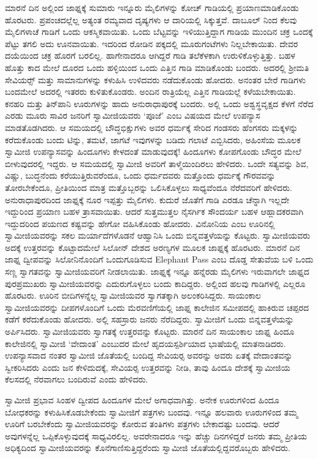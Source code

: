  ಮಾರನೆ ದಿನ ಅಲ್ಲಿಂದ ಜಾಫ್ನಕ್ಕೆ ಸುಮಾರು ಇನ್ನೂರು ಮೈಲಿಗಳನ್ನು ಕೋಚ್ ಗಾಡಿಯಲ್ಲಿ ಪ್ರಯಾಣಮಾಡಿಕೊಂಡು ಹೊರಟರು. ಪ್ರಪಂಚದಲ್ಲೆಲ್ಲ ಅತ್ಯಂತ ರಮ್ಯವಾದ ದೃಷ್ಯಗಳು ಆ ದಾರಿಯಲ್ಲಿ ಸಿಕ್ಕುತ್ತವೆ. ದಾಬೂಲ್ ನಿಂದ ಕೆಲವು ಮೈಲಿಗಳಾಚೆ ಗಾಡಿಗೆ ಒಂದು ಆಕಸ್ಮಿಕವಾಯಿತು. ಒಂದು ಬೆಟ್ಟವನ್ನು ಇಳಿಯುತ್ತಿದ್ದಾಗ ಗಾಡಿಯ ಮುಂದಿನ ಚಕ್ರ ಒಂದಕ್ಕೆ ಪೆಟ್ಟು ತಗಲಿ ಅದು ಊನವಾಯಿತು. ಇದರಿಂದ ರೋಡಿನ ಪಕ್ಕದಲ್ಲಿ ಮೂರುಗಂಟೆಗಳು ನಿಲ್ಲಬೇಕಾಯಿತು. ದೇವರ ದಯೆಯಿಂದ ಚಕ್ರ ಹೊರಗೆ ಬರಲಿಲ್ಲ. ಹಾಗೇನಾದರೂ ಆಗಿದ್ದರೆ ಗಾಡಿ ತಲೆಕೆಳಕಾಗಿ ಉರುಳಿಕೊಳ್ಳುತ್ತಿತ್ತು. ಬಹಳ ಹೊತ್ತು ಕಾದ ಮೇಲೆ ದೂರದ ಒಂದು ಹಳ್ಳಿಯಿಂದ ಒಂದು ಎತ್ತಿನ ಗಾಡಿ ಮಾಡಿಕೊಂಡು ಬಂದರು. ಅದರಲ್ಲಿ ಶ‍್ರೀಮತಿ ಸೇವಿಯರ್ಸ್‍‍ ಮತ್ತು ಸಾಮಾನುಗಳನ್ನು ಕಳುಹಿಸಿ ಉಳಿದವರು ನಡೆದುಕೊಂಡು ಹೋದರು. ಅನಂತರ ಬೇರೆ ಗಾಡಿಗಳು ಬಂದಮೇಲೆ ಅದರಲ್ಲಿ ಇತರರು ಕುಳಿತುಕೊಂಡರು. ಅಂದಿನ ರಾತ್ರಿಯೆಲ್ಲ ಎತ್ತಿನ ಗಾಡಿಯಲ್ಲೆ ಕಳೆಯಬೇಕಾಯಿತು. ಕನಹರಿ ಮತ್ತು ತಿನ್‍ಪಾನಿ ಊರುಗಳನ್ನು ಹಾದು ಅನುರಾಧಾಪುರಕ್ಕೆ ಬಂದರು. ಅಲ್ಲಿ ಒಂದು ಅಶ್ವಸ್ಥವೃಕ್ಷದ ಕೆಳಗೆ ನೆರೆದ ಎರಡು ಮೂರು ಸಾವಿರ ಜನರಿಗೆ ಸ್ವಾಮೀಜಿಯವರು ‘ಪೂಜೆ’ ಎಂಬ ವಿಷಯದ ಮೇಲೆ ಉಪನ್ಯಾಸ ಮಾಡತೊಡಗಿದರು. ಆ ಸಮಯದಲ್ಲಿ ಬೌದ್ಧಭಿಕ್ಷುಗಳು ಅವರ ಧರ್ಮಕ್ಕೆ ಸೇರಿದ ಗಂಡಸರು ಹೆಂಗಸರು ಮಕ್ಕಳನ್ನು ಕರೆದುಕೊಂಡು ಬಂದು ಟಿನ್ನು, ತಮಟೆ, ಜಾಗಟೆ ಇವುಗಳನ್ನು ಬಡಿದು ಗಲಾಟೆ ಎಬ್ಬಿಸಿದರು, ಅಹಿಂಸೆಯ ಮೂಲಕ ಸ್ವಾಮೀಜಿ ಉಪನ್ಯಾಸವನ್ನು ಹಿಂದೂಗಳು ಕೇಳದಂತೆ ಮಾಡುವುದಕ್ಕೆ‌! ಹಿಂದೂಗಳು ಕೋಪಗೊಂಡು ಬೌದ್ಧರ ಮೇಲೆ ಬೀಳುವುದರಲ್ಲಿ ಇದ್ದರು. ಆ ಸಮಯದಲ್ಲಿ ಸ್ವಾಮೀಜಿ ಅವರಿಗೆ ತಾಳ್ಮೆಯಿಂದಿರಲು ಹೇಳಿದರು. ಒಂದೇ ಸತ್ಯವನ್ನು ಶಿವ, ವಿಷ್ಣು, ಬುದ್ಧನೆಂದು ಕರೆಯುತ್ತಿರುವರೆಂದೂ, ಒಂದು ಧರ್ಮದವರು ಮತ್ತೊಂದು ಧರ್ಮಕ್ಕೆ ಗೌರವವನ್ನು ತೋರಬೇಕೆಂದೂ, ಪ್ರೀತಿಯಿಂದ ಮಾತ್ರ ಮತ್ತೊಬ್ಬರನ್ನು ಒಲಿಸಿಕೊಳ್ಳಲು ಸಾಧ್ಯವೆಂದೂ ನೆರೆದವರಿಗೆ ಹೇಳಿದರು. ಅನುರಾಧಾಪುರದಿಂದ ಜಾಫ್ನಕ್ಕೆ ನೂರ ಇಪ್ಪತ್ತು ಮೈಲಿಗಳು. ಕುದುರೆ ಜೊತೆಗೆ ಗಾಡಿ ಎರಡೂ ಚೆನ್ನಾಗಿ ಇಲ್ಲದೇ ಇದ್ದುರಿಂದ ಪ್ರಯಾಣ ಬಹಳ ತ್ರಾಸವಾಯಿತು. ಆದರೆ ಸುತ್ತಮುತ್ತಲ ನೈಸರ್ಗಿಕ ಸೌಂದರ್ಯ ಬಹಳ ಆಹ್ಲಾದಕರವಾಗಿ ಇದ್ದುದರಿಂದ ಪಯಣದ ಕಷ್ಟವನ್ನು ಹೇಗೋ ವಹಿಸಿಕೊಂಡು ಹೋದರು. ವಿನೋನಿಯ ಎಂಬ ಊರಿನಲ್ಲಿ ಸ್ವಾಮೀಜಿಯವರನ್ನು ಸಕಲ ಮರ್ಯಾದೆಗಳೊಡನೆ ಆಹ್ವಾನಿಸಿ ಒಂದು ಬಿನ್ನವತ್ತಳೆಯನ್ನು ಕೊಟ್ಟರು. ಸ್ವಾಮೀಜಿಯವರು ಅದಕ್ಕೆ ಉತ್ತರವನ್ನು ಕೊಟ್ಟಾದಮೇಲೆ ಸಿಲೋನ್ ದೇಶದ ಅರಣ್ಯಗಳ ಮೂಲಕ ಜಾಫ್ನಕ್ಕೆ ಹೊರಟರು. ಮಾರನೆ ದಿನ ಜಾಫ್ನ ದ್ವೀಪವನ್ನು ಸಿಲೋನಿನೊಂದಿಗೆ ಒಂದುಗೂಡಿಸುವ Elephant Pass ಎಂಬ ದೊಡ್ಡ ಸೇತುವೆಯ ಬಳಿ ಒಂದು ಸಣ್ಣ ಸ್ವಾಗತವನ್ನು ಸ್ವಾಮೀಜಿಯವರಿಗೆ ನೀಡಲಾಯಿತು. ಜಾಫ್ನಕ್ಕೆ ಇನ್ನೂ ಹನ್ನೆರಡು ಮೈಲಿಗಳು ಇರುವಾಗಲೇ ಜಾಫ್ನದ ಪುರಪ್ರಮುಖರು ಸ್ವಾಮೀಜಿಯವರನ್ನು ಎದುರುಗೊಳ್ಳಲು ಬಂದು ಕಾದಿದ್ದರು. ಅಲ್ಲಿಂದ ಹಲವು ಗಾಡಿಗಳಲ್ಲಿ ಎಲ್ಲರೂ ಹೊರಟರು. ಊರಿನ ಬೀದಿಗಳನ್ನೆಲ್ಲ ಸ್ವಾಮೀಜಿಯವರ ಸ್ವಾಗತಕ್ಕಾಗಿ ಅಲಂಕರಿಸಿದ್ದರು. ಸಾಯಂಕಾಲ ಸ್ವಾಮೀಜಿಯವರನ್ನು ದೀಪಗಳೊಂದಿಗೆ ಒಂದು ಮೆರವಣಿಗೆಯಲ್ಲಿ ಜಾಫ್ನ ಕಾಲೇಜಿನ ಸಮೀಪದಲ್ಲಿ ಹಾಕಿರುವ ಚಪ್ಪರದ ಕಡೆಗೆ ಕರೆದುಕೊಂಡು ಹೋದರು. ಅಲ್ಲಿ ಸಹಸ್ರಾರು ಜನರು ನೆರೆದಿದ್ದರು. ಸ್ವಾಮೀಜಿಗೆ ಒಂದು ಬಿನ್ನವತ್ತಳೆಯನ್ನು ಅರ್ಪಿಸಿದರು. ಸ್ವಾಮೀಜಿಯವರು ಸ್ವಾಗತಕ್ಕೆ ಉತ್ತರವನ್ನು ಕೊಟ್ಟರು. ಮಾರನೆ ದಿನ ಸಾಯಂಕಾಲ ಜಾಫ್ನ ಹಿಂದೂ ಕಾಲೇಜಿನಲ್ಲಿ ಸ್ವಾಮೀಜಿ ‘ವೇದಾಂತ’ ಎಂಬುದರ ಮೇಲೆ ಹೃದಯಸ್ಪರ್ಶಿಯಾದ ಭಾಷೆಯಲ್ಲಿ ಮಾತನಾಡಿದರು. ಉಪನ್ಯಾಸವಾದ ನಂತರ ಸ್ವಾಮೀಜಿ ಜೊತೆಯಲ್ಲಿ ಬಂದಿದ್ದ ಸೇವಿಯರ‍್ಸ ಅವರನ್ನು ಅವರು ಏತಕ್ಕೆ ವೇದಾಂತವನ್ನು ಸ್ವೀಕರಿಸಿದರು ಎಂದು ಜನ ಕೇಳಿದುದಕ್ಕೆ, ಸೇವಿಯರ‍್ಸ ಉತ್ತರವನ್ನು ನೀಡಿ, ತಾವು ಹಿಂದೂ ದೇಶಕ್ಕೆ ಸ್ವಾಮೀಜಿಯ ಕೆಲಸದಲ್ಲಿ ನೆರವಾಗಲು ಬಂದಿರುವೆ ಎಂದು ಹೇಳಿದರು. 

 ಸ್ವಾಮೀಜಿ ಪ್ರಭಾವ ಸಿಂಹಳ ದ್ವೀಪದ ಹಿಂದೂಗಳ ಮೇಲೆ ಅಗಾಧವಾಗಿತ್ತು. ಅನೇಕ ಊರುಗಳಿಂದ ಹಿಂದೂ ಬೋಧಕರನ್ನು ಕಳುಹಿಸಿಕೊಡಬೇಕೆಂದು ಸ್ವಾಮೀಜಿಗೆ ಪತ್ರಗಳು ಬಂದವು. ಇನ್ನೂ ಹಲವಾರು ಊರುಗಳಿಂದ ತಮ್ಮ ಊರಿಗೆ ಬರಬೇಕೆಂದು ಸ್ವಾಮೀಜಿಯವರನ್ನು ಕೋರುವ ತಂತಿಗಳು ಪತ್ರಗಳು ಬೇಕಾದಷ್ಟು ಬಂದವು. ಆದರೆ ಅವುಗಳನ್ನೆಲ್ಲ ಒಪ್ಪಿಕೊಳ್ಳುವುದಕ್ಕೆ ಸಾಧ್ಯವಿರಲಿಲ್ಲ. ಅವರೇನಾದರೂ ಇನ್ನು ಹೆಚ್ಚು ದಿನಗಳಿದ್ದರೆ ಜನರು ತಮ್ಮ ಪ್ರೀತಿಯ ಅಧಿಕ್ಯದಿಂದ ಸ್ವಾಮೀಜಿಯವರನ್ನು ಕೊನೆಗಾಣಿಸುತ್ತಿದ್ದರೆಂದು ಸ್ವಾಮೀಜಿ ಜೊತೆಯಲ್ಲಿದ್ದವರೊಬ್ಬರು ಹೇಳಿದರು. 

